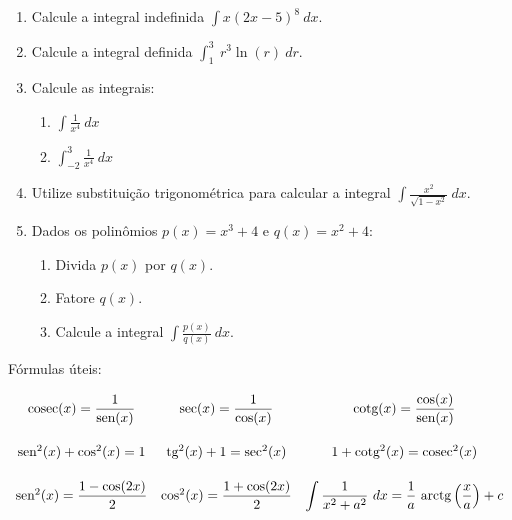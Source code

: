 \documentclass[a4paper,5pt]{amsbook}
\newcommand{\sen}{\text{sen}}
\newcommand{\tg}{\mbox{tg}}
\newcommand{\cosec}{\mbox{cosec}}
\newcommand{\cotg}{\mbox{cotg}}
\newcommand{\ds}{\displaystyle}
\begin{document}
\vspace{0.2cm}
\begin{enumerate}

\item Calcule a integral indefinida $\ds\int x{(2x-5)}^8\ dx$.
\vspace{0.5cm}

\item Calcule a integral definida $\ds\int_1^3\ r^3 \ln(r)\ dr$.
\vspace{0.5cm}

\item Calcule as integrais:
	\begin{enumerate}
		\item $\ds\int \frac{1}{x^4}\ dx$
		\vspace{0.2cm}
		\item $\ds\int_{-2}^3 \frac{1}{x^4}\ dx$
	\end{enumerate}
\vspace{0.5cm}

\item Utilize substitui\c{c}\~ao trigonom\'etrica para calcular a integral $\ds\int \frac{x^2}{\sqrt{1-x^2}}\ dx$.
\vspace{0.5cm}

\item Dados os polin\^omios $p(x) = x^3 + 4$ e $q(x) = x^2+4$:
	\vspace{0.2cm}
	\begin{enumerate}
		\item Divida $p(x)$ por $q(x)$.
		\vspace{0.2cm}
		\item Fatore $q(x)$.
		\vspace{0.1cm}
		\item Calcule a integral $\ds\int \frac{p(x)}{q(x)}\ dx$.
	\end{enumerate}

\end{enumerate}

\vspace{1cm}
F\'ormulas \'uteis:

$\begin{array}{ccc}
	\vspace{0.5cm}
	\cosec(x) = \displaystyle\frac{1}{\sen(x)} & \sec(x) = \displaystyle\frac{1}{\cos(x)} & \cotg(x) = \displaystyle\frac{\cos(x)}{\sen(x)} \\
	\vspace{0.5cm}
	\sen^2(x) + \cos^2(x) = 1 & \tg^2(x) + 1 = \sec^2(x) & 1 + \cotg^2(x) = \cosec^2(x) \\
	\vspace{0.5cm}
	\sen^2(x) = \displaystyle\frac{1 - \cos(2x)}{2} & \cos^2(x) = \displaystyle\frac{1 + \cos(2x)}{2} & \ds\int\frac{1}{x^2+a^2}\ dx = \frac{1}{a}\ \mbox{arctg}\left(\frac{x}{a}\right) + c
\end{array}$
\end{document}
